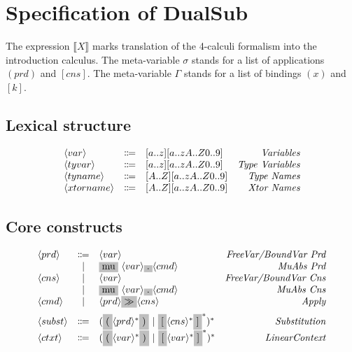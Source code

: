 \documentclass[11pt]{article}
\newcommand{\translate}[1]{\llbracket #1 \rrbracket}
\newcommand{\nonterminal}[1]{\langle #1 \rangle}
\newcommand{\terminal}[1]{\colorbox{lightgray}{#1}}
\begin{document}
\section{Specification of DualSub}

The expression $\translate{X}$ marks translation of the 4-calculi formalism into the introduction calculus.
The meta-variable $\sigma$ stands for a list of applications $(prd)$ and $[cns]$.
The meta-variable $\Gamma$ stands for a list of bindings $(x)$ and $[k]$.

\subsection{Lexical structure}
\[
  \begin{array}{lclr}
    \nonterminal{var} & \Coloneqq & [a..z][a..zA..Z0..9] & \emph{Variables} \\
    \nonterminal{tyvar} & \Coloneqq & [a..z][a..zA..Z0..9] & \emph{Type Variables} \\
    \nonterminal{tyname} & \Coloneqq & [A..Z][a..zA..Z0..9] & \emph{Type Names} \\
    \nonterminal{xtorname} & \Coloneqq & [A..Z][a..zA..Z0..9] & \emph{Xtor Names} \\
  \end{array}
\]

\subsection{Core constructs}
\[
  \begin{array}{lclr}
    \nonterminal{prd} & \Coloneqq & \nonterminal{var} & \emph{FreeVar/BoundVar Prd} \\
    & | & \terminal{mu}\ \nonterminal{var} \terminal{.} \nonterminal{cmd} & \textit{MuAbs Prd} \\
    \nonterminal{cns} & | & \nonterminal{var} & \textit{FreeVar/BoundVar Cns} \\
    & | & \terminal{mu}\ \nonterminal{var} \terminal{.} \nonterminal{cmd} & \textit{MuAbs Cns} \\
    \nonterminal{cmd} & | & \nonterminal{prd} \terminal{$\gg$} \nonterminal{cns} & \textit{Apply} \\[0.2cm]
    \nonterminal{subst} & \Coloneqq & (\terminal{(}\nonterminal{prd}^{\ast}\terminal{)}\ |\ \terminal{[}\nonterminal{cns}^{\ast}\terminal{]}^{\ast})^{\ast} & \emph{Substitution} \\
    \nonterminal{ctxt} & \Coloneqq & (\terminal{(}\nonterminal{var}^{\ast}\terminal{)}\ |\ \terminal{[}\nonterminal{var}^{\ast}\terminal{]}^{\ast})^{\ast} & \emph{LinearContext}
  \end{array}
\]
\end{document}
